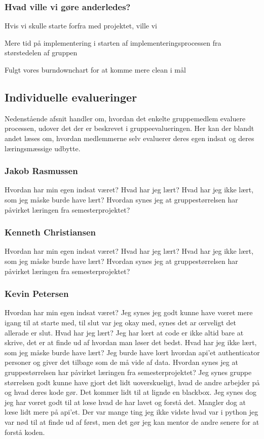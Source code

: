 \subsubsection{Hvad ville vi gøre anderledes?}
Hvis vi skulle starte forfra med projektet, ville vi 

Mere tid på implementering i starten af implementeringsprocessen fra størstedelen af gruppen

Fulgt vores burndownchart for at komme mere clean i mål


\subsection{Individuelle evalueringer}
Nedenstående afsnit handler om, hvordan det enkelte gruppemedlem evaluere processen, udover det der er beskrevet i gruppeevalueringen. Her kan der blandt andet læses om, hvordan medlemmerne selv evaluerer deres egen indsat og deres læringsmæssige udbytte.  

\subsubsection{Jakob Rasmussen}
Hvordan har min egen indsat været?
Hvad har jeg lært?
Hvad har jeg ikke lært, som jeg måske burde have lært?
Hvordan synes jeg at gruppestørrelsen har påvirket læringen fra semesterprojektet?


\subsubsection{Kenneth Christiansen}
Hvordan har min egen indsat været?
Hvad har jeg lært?
Hvad har jeg ikke lært, som jeg måske burde have lært?
Hvordan synes jeg at gruppestørrelsen har påvirket læringen fra semesterprojektet?

\subsubsection{Kevin Petersen}
Hvordan har min egen indsat været?
Jeg synes jeg godt kunne have vœret mere igang til at starte med, til slut var jeg okay med, synes det ar œrveligt det allerade er slut.
Hvad har jeg lært?
Jeg har lœrt at code er ikke altid bare at skrive, det er at finde ud af hvordan man løser det bedst.
Hvad har jeg ikke lært, som jeg måske burde have lært?
Jeg burde have lœrt hvordan api'et authenticator personer og giver det tilbage som de må vide af data.
Hvordan synes jeg at gruppestørrelsen har påvirket læringen fra semesterprojektet?
Jeg synes gruppe størrelsen godt kunne have gjort det lidt uoverskueligt, hvad de andre arbejder på og hvad deres kode gør.
Det kommer lidt til at lignde en blackbox.
Jeg synes dog jeg har vœret godt til at lœse hvad de har lavet og forstå det. Mangler dog at lœse lidt mere på api'et.
Der var mange ting jeg ikke vidste hvad var i python jeg var nød til at finde ud af først, men det gør jeg kan mentor de andre senere for at forstå koden.

